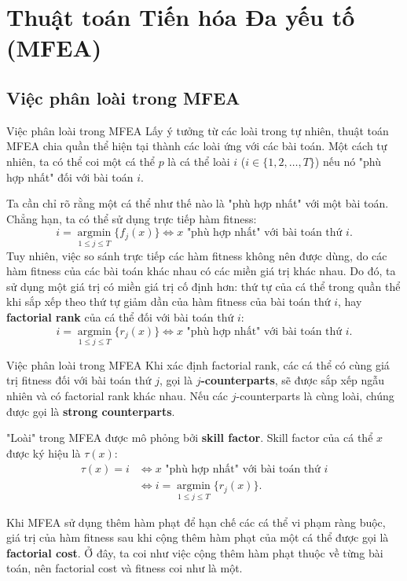\section{Thuật toán Tiến hóa Đa yếu tố (MFEA)} %
\label{sec:Thuật toán Tiến hóa Đa yếu tố (MFEA)}

\subsection{Việc phân loài trong MFEA} %
\label{sub:Việc phân loài trong MFEA}

\begin{frame}{Việc phân loài trong MFEA}
  Lấy ý tưởng từ các loài trong tự nhiên, thuật toán MFEA chia quần thể hiện tại
  thành các loài ứng với các bài toán. Một cách tự nhiên, ta có thể coi một cá thể \( p
  \) là cá thể loài \( i \) (\( i \in \{1, 2, \ldots , T\}   \)) nếu nó "phù hợp
  nhất" đối với bài toán \( i \).

  Ta cần chỉ rõ rằng một cá thể như thế nào là "phù hợp nhất"
  với một bài toán. Chẳng hạn, ta có thể sử dụng trực tiếp hàm fitness:
  \[
    i = \operatorname*{argmin}_{1 \le j \le  T} \{f_{j}(x)\}  \iff x \text{ "phù
    hợp nhất" với bài toán thứ } i
  .\] 
  Tuy nhiên, việc so sánh trực tiếp các hàm fitness không nên được dùng, do các
  hàm fitness của các bài toán khác nhau có các miền giá trị khác nhau. Do đó,
  ta sử dụng một giá trị có miền giá trị cố định hơn: thứ tự của cá thể trong
  quần thể khi sắp xếp theo thứ tự giảm dần của hàm fitness của bài toán thứ \(
  i\), hay \textbf{factorial rank} của cá thể đối với bài toán thứ \( i \):
  \[
    i = \operatorname*{argmin}_{1 \le j \le  T} \{r_{j}(x)\}  \iff x \text{ "phù
    hợp nhất" với bài toán thứ } i
  .\] 
\end{frame}

\begin{frame}{Việc phân loài trong MFEA}
  Khi xác định factorial rank, các cá thể có cùng giá trị fitness đối với bài
  toán thứ \( j \), gọi là \textbf{\( j \)-counterparts}, sẽ được sắp xếp ngẫu nhiên và
  có factorial rank khác nhau. Nếu các \( j \)-counterparts là cùng loài, chúng
  được gọi là \textbf{strong counterparts}.

  "Loài" trong MFEA được mô phỏng bởi \textbf{skill factor}. Skill factor của cá
  thể \( x \) được ký hiệu là \( \tau (x) \):
  \begin{align*}
    \tau (x) = i &\iff x \text{ "phù hợp nhất" với bài toán thứ } i\\
                 &\iff i = \operatorname*{argmin}_{1 \le j \le  T} \{r_{j}(x)\} 
  .\end{align*}

  Khi MFEA sử dụng thêm hàm phạt để hạn chế các cá thể vi phạm ràng buộc, giá
  trị của hàm fitness sau khi cộng thêm hàm phạt của một cá thể được gọi là
  \textbf{factorial cost}. Ở đây, ta coi như việc cộng thêm hàm phạt thuộc về
  từng bài toán, nên factorial cost và fitness coi như là một.
\end{frame}

